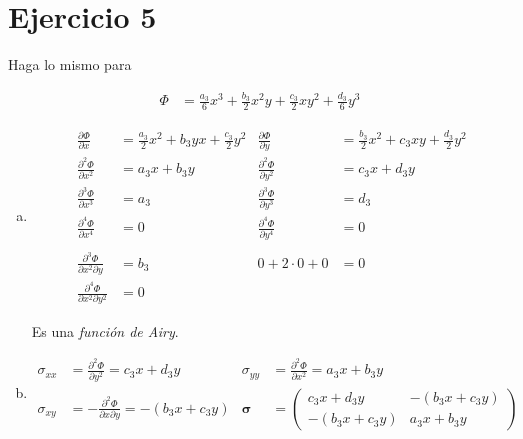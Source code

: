 \documentclass[a4paper,10pt,twoside,final,spanish]{article}
\begin{document}
\begin{enumerate}[a.]
\end{enumerate}

\section*{Ejercicio 5}

Haga lo mismo para

\begin{align*}
\Phi &= \frac{a_{3}}{6}x^{3}+\frac{b_{3}}{2}x^{2}y
+\frac{c_{3}}{2}xy^{2}+\frac{d_{3}}{6}y^{3}
\end{align*}

\dotfill

\begin{enumerate}[a.]
\item 

\begin{align*}
\frac{\partial\Phi}{\partial x}
&= \frac{a_{3}}{2}x^{2}+b_{3}yx+\frac{c_{3}}{2}y^{2}
& \frac{\partial\Phi}{\partial y}
&= \frac{b_{3}}{2}x^{2}+c_{3}xy+\frac{d_{3}}{2}y^{2} \\
\frac{\partial^{2}\Phi}{\partial x^{2}} &= a_{3}x+b_{3}y
& \frac{\partial^{2}\Phi}{\partial y^{2}} &= c_{3}x+d_{3}y \\
\frac{\partial^{3}\Phi}{\partial x^{3}} &= a_{3}
& \frac{\partial^{3}\Phi}{\partial y^{3}} &= d_{3} \\
\frac{\partial^{4}\Phi}{\partial x^{4}} &= 0
& \frac{\partial^{4}\Phi}{\partial y^{4}} &= 0 \\ \\
\frac{\partial^{3}\Phi}{\partial x^{2}\partial y} &= b_{3}
& 0+2\cdot 0+0 &= 0 \\
\frac{\partial^{4}\Phi}{\partial x^{2}\partial y^{2}} &= 0
\end{align*}

Es una \textit{función de Airy}.

\item 

\begin{align*}
\sigma_{xx} &= \frac{\partial^{2}\Phi}{\partial y^{2}}=c_{3}x+d_{3}y &
\sigma_{yy} &= \frac{\partial^{2}\Phi}{\partial x^{2}}=a_{3}x+b_{3}y \\
\sigma_{xy} &= -\frac{\partial^{2}\Phi}{\partial x \partial y}=-(b_{3}x+c_{3}y) &
\mathbf{\sigma} &= \begin{pmatrix}
c_{3}x+d_{3}y  & -(b_{3}x+c_{3}y) \\
-(b_{3}x+c_{3}y) & a_{3}x+b_{3}y
\end{pmatrix}
\end{align*}


\end{enumerate}
\end{document}
